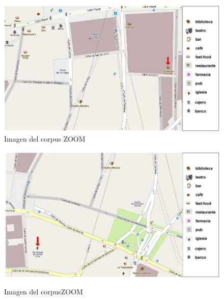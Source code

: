 \begin{figure}
\begin{minipage}[b]{0.5\linewidth}
\centering
\includegraphics[width=\textwidth]{images/corpus/mapa15.png}\\[0pt]
\caption{Imagen del corpus ZOOM}
\label{mapa15}
\end{minipage}
\hspace*{0cm}
\begin{minipage}[b]{0.5\linewidth}
\centering
\includegraphics[width=\textwidth]{images/corpus/mapa16.png}\\[0pt]
\caption{Imagen del corpusZOOM}
\label{mapa16}
\end{minipage}
\end{figure}

